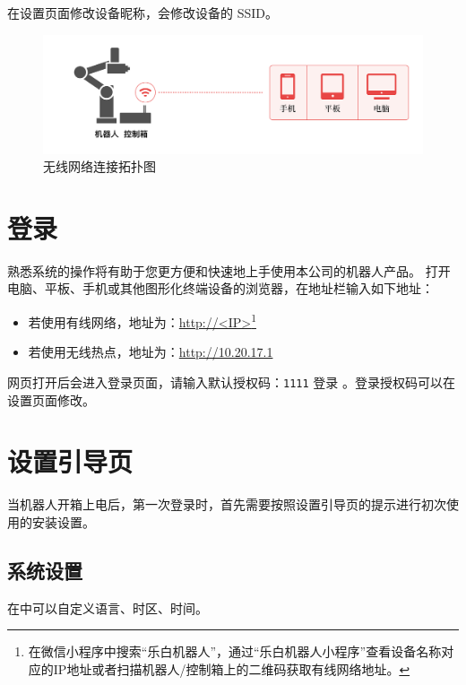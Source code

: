 在设置页面修改设备昵称，会修改设备的 SSID。

\begin{figure}[ht]
    \centering
    \includegraphics[width=\textwidth]{image/network-2.pdf}
    \caption{无线网络连接拓扑图}
    \label{fig:无线网络连接拓扑图}
\end{figure}


\section{登录}
熟悉\LM 系统的操作将有助于您更方便和快速地上手使用本公司的机器人产品。
打开电脑、平板、手机或其他图形化终端设备的浏览器，在地址栏输入如下地址：
\begin{itemize}
	\item 若使用有线网络，地址为：\url{http://<IP>}\footnote{在微信小程序中搜索“乐白机器人”，通过“乐白机器人小程序”查看设备名称对应的IP地址或者扫描机器人/控制箱上的二维码获取有线网络地址。}
	\item 若使用无线热点，地址为：\url{http://10.20.17.1}
\end{itemize}

网页打开后会进入登录页面，请输入默认授权码：\verb|1111| 登录 \LM 。登录授权码可以在设置页面修改。



\section{设置引导页}

当机器人开箱上电后，第一次登录\LM 时，首先需要按照设置引导页的提示进行初次使用的安装设置。
\subsection{系统设置}
在中可以自定义语言、时区、时间。


